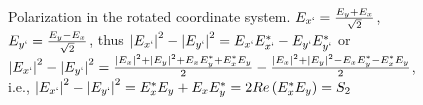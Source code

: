 \begin{figure}
\centering



\caption{Polarization in the rotated coordinate system.
  $E_{x`} = \frac{E_y + E_x}{\sqrt{2}}$,
  $E_{y`} = \frac{E_y - E_x}{\sqrt{2}}$, thus
  $
  \left|E_{x`}\right|^2 -  \left|E_{y`}\right|^2 =
  E_{x`}E_{x`}^\ast -  E_{y`}E_{y`}^\ast
  $
  or
  $
  \left|E_{x`}\right|^2 -  \left|E_{y`}\right|^2
  = \frac{\left|E_x\right|^2 + \left|E_y\right|^2 + E_xE_y^\ast
    +E_x^\ast E_y }{2} -
  \frac{\left|E_x\right|^2 + \left|E_y\right|^2 - E_xE_y^\ast
    - E_x^\ast E_y }{2}
  $,
  i.e.,
  $
  \left|E_{x`}\right|^2 -  \left|E_{y`}\right|^2
  = E_x^\ast E_y + E_xE_y^\ast = 2 Re\left(E_x^\ast E_y\right) = S_2
  $
}
\label{figPart3EntangS2}
\end{figure}